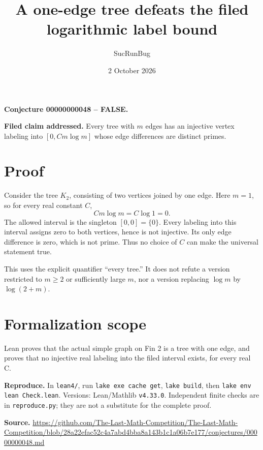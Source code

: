 \documentclass[11pt]{article}
\title{A one-edge tree defeats the filed logarithmic label bound}
\author{SucRunBug}
\date{2 October 2026}
\begin{document}
\maketitle
\textbf{Conjecture 00000000048 -- FALSE.}

\textbf{Filed claim addressed.} Every tree with $m$ edges has an injective vertex labeling into $[0,Cm\log m]$ whose edge differences are distinct primes.

\section*{Proof}
Consider the tree $K_2$, consisting of two vertices joined by one edge. Here $m=1$, so for every real constant $C$,
\[Cm\log m=C\log 1=0.\]
The allowed interval is the singleton $[0,0]=\{0\}$. Every labeling into this interval assigns zero to both vertices, hence is not injective. Its only edge difference is zero, which is not prime. Thus no choice of $C$ can make the universal statement true.

This uses the explicit quantifier ``every tree.'' It does not refute a version restricted to $m\ge2$ or sufficiently large $m$, nor a version replacing $\log m$ by $\log(2+m)$.

\section*{Formalization scope}
Lean proves that the actual simple graph on Fin 2 is a tree with one edge, and proves that no injective real labeling into the filed interval exists, for every real C.

\textbf{Reproduce.} In \texttt{lean4/}, run \texttt{lake exe cache get},
\texttt{lake build}, then \texttt{lake env lean Check.lean}. Versions:
Lean/Mathlib \texttt{v4.33.0}. Independent finite checks are in
\texttt{reproduce.py}; they are not a substitute for the complete proof.

\textbf{Source.} \url{https://github.com/The-Last-Math-Competition/The-Last-Math-Competition/blob/28a22efac52c4a7abd4bba8a143b1c1a06b7e177/conjectures/00000000048.md}
\end{document}
